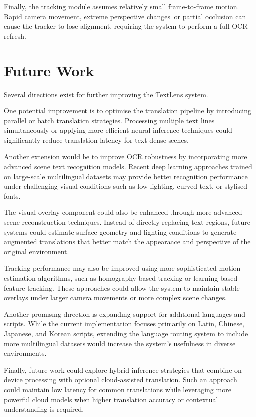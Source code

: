Finally, the tracking module assumes relatively small frame-to-frame motion. Rapid camera movement, extreme perspective changes, or partial occlusion can cause the tracker to lose alignment, requiring the system to perform a full OCR refresh.

\section{Future Work}

Several directions exist for further improving the TextLens system.

One potential improvement is to optimise the translation pipeline by introducing parallel or batch translation strategies. Processing multiple text lines simultaneously or applying more efficient neural inference techniques could significantly reduce translation latency for text-dense scenes.

Another extension would be to improve OCR robustness by incorporating more advanced scene text recognition models. Recent deep learning approaches trained on large-scale multilingual datasets may provide better recognition performance under challenging visual conditions such as low lighting, curved text, or stylised fonts.

The visual overlay component could also be enhanced through more advanced scene reconstruction techniques. Instead of directly replacing text regions, future systems could estimate surface geometry and lighting conditions to generate augmented translations that better match the appearance and perspective of the original environment.

Tracking performance may also be improved using more sophisticated motion estimation algorithms, such as homography-based tracking or learning-based feature tracking. These approaches could allow the system to maintain stable overlays under larger camera movements or more complex scene changes.

Another promising direction is expanding support for additional languages and scripts. While the current implementation focuses primarily on Latin, Chinese, Japanese, and Korean scripts, extending the language routing system to include more multilingual datasets would increase the system's usefulness in diverse environments.

Finally, future work could explore hybrid inference strategies that combine on-device processing with optional cloud-assisted translation. Such an approach could maintain low latency for common translations while leveraging more powerful cloud models when higher translation accuracy or contextual understanding is required.

